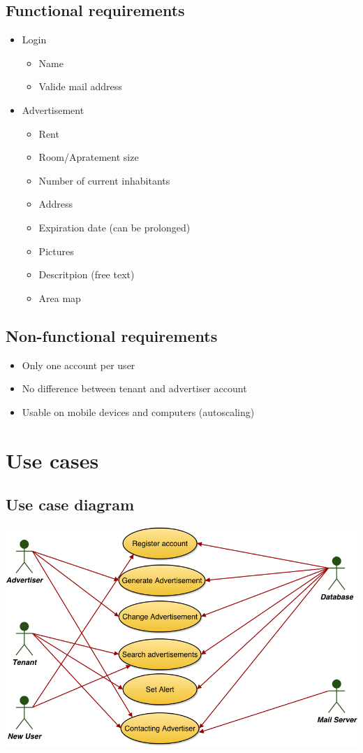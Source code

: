 \documentclass[a4paper,11pt]{article}
\begin{document}
\subsection*{Functional requirements}
\begin{itemize}
  \item Login
  \begin{itemize}
    \item Name
    \item Valide mail address
  \end{itemize}
  \item Advertisement
  \begin{itemize}
    \item Rent
    \item Room/Apratement size
    \item Number of current inhabitants
    \item Address
    \item Expiration date (can be prolonged)
    \item Pictures
    \item Descritpion (free text)
    \item Area map
  \end{itemize}
\end{itemize}
\subsection*{Non-functional requirements}
\begin{itemize}
  \item Only one account per user
  \item No difference between tenant and advertiser account
  \item Usable on mobile devices and computers (autoscaling)
\end{itemize}

\section{Use cases}
\subsection*{Use case diagram}
\begin{center}
	\includegraphics[width=400bp]{UseCases.png}
\end{center}
\end{document}
